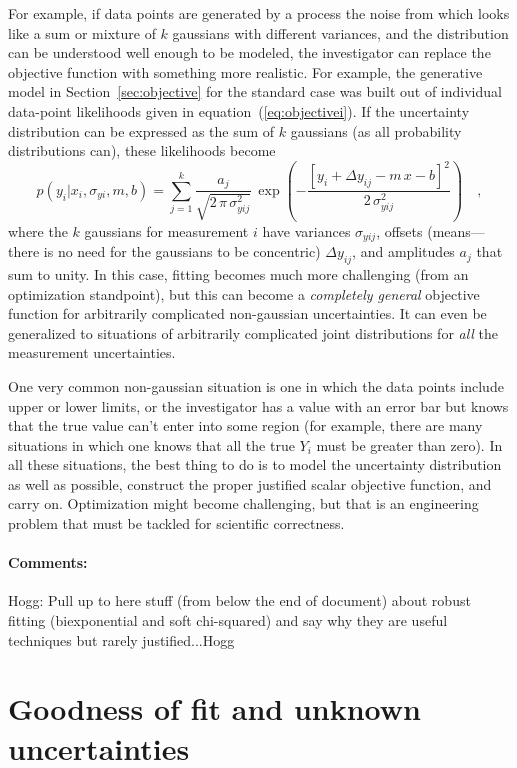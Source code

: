 \documentclass[12pt,twoside]{article}
\newcommand{\sectionname}{Section}
\newcommand{\equationname}{equation}
\newcommand{\commentsname}{Comments}
\newcounter{problem}
\newenvironment{comments}{\paragraph{\commentsname:}}{}
\begin{document}
For example, if data points are generated by a process the noise from
which looks like a sum or mixture of $k$ gaussians with different
variances, and the distribution can be understood well enough to be
modeled, the investigator can replace the objective function with
something more realistic.  For example, the generative model in
\sectionname~\ref{sec:objective} for the standard case was built out
of individual data-point likelihoods given in
\equationname~(\ref{eq:objectivei}).  If the uncertainty distribution
can be expressed as the sum of $k$ gaussians (as all probability
distributions can), these likelihoods become
\begin{equation}
p(y_i|x_i,\sigma_{yi},m,b) = \sum_{j=1}^k
 \frac{a_j}{\sqrt{2\,\pi\,\sigma_{yij}^2}}
 \,\exp\left(-\frac{[y_i+\Delta y_{ij}-m\,x-b]^2}{2\,\sigma_{yij}^2}\right)
 \quad ,
\end{equation}
where the $k$ gaussians for measurement $i$ have variances
$\sigma_{yij}$, offsets (means---there is no need for the gaussians to
be concentric) $\Delta y_{ij}$, and amplitudes $a_j$ that sum to
unity.  In this case, fitting becomes much more challenging (from an
optimization standpoint), but this can become a \emph{completely
  general} objective function for arbitrarily complicated non-gaussian
uncertainties.  It can even be generalized to situations of
arbitrarily complicated joint distributions for \emph{all} the
measurement uncertainties.

One very common non-gaussian situation is one in which the data points
include upper or lower limits, or the investigator has a value with an
error bar but knows that the true value can't enter into some region
(for example, there are many situations in which one knows that all
the true $Y_i$ must be greater than zero).  In all these situations,
the best thing to do is to model the uncertainty distribution as well
as possible, construct the proper justified scalar objective function,
and carry on.  Optimization might become challenging, but that is an
engineering problem that must be tackled for scientific correctness.

\begin{comments}
Hogg: Pull up to here stuff (from below the end of document) about
robust fitting (biexponential and soft chi-squared) and say why they
are useful techniques but rarely justified...Hogg
\end{comments}

\section{Goodness of fit and unknown uncertainties}\label{sec:goodness}
\end{document}
